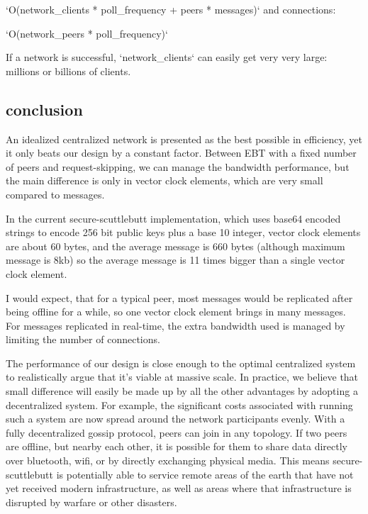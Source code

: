 \documentclass[sigconf]{acmart}
\begin{document}
`O(network\_clients * poll\_frequency + peers * messages)`
and connections:

`O(network\_peers * poll\_frequency)`

If a network is successful, `network\_clients` can easily get very very
large: millions or billions of clients.

\subsection{conclusion}

An idealized centralized network is presented as the best possible in
efficiency, yet it only beats our design by a constant factor. Between
EBT with a fixed number of peers and request-skipping, we can manage
the bandwidth performance, but the main difference is only in vector
clock elements, which are very small compared to messages.

In the current secure-scuttlebutt implementation, which uses base64
encoded strings to encode 256 bit public keys plus a base 10 integer,
vector clock elements are about 60 bytes, and the average message is
660 bytes (although maximum message is 8kb) so the average message is
11 times bigger than a single vector clock element.

I would expect, that for a typical peer, most messages would be
replicated after being offline for a while, so one vector clock
element brings in many messages. For messages replicated in real-time,
the extra bandwidth used is managed by limiting the number of
connections.

The performance of our design is close enough to the optimal
centralized system to realistically argue that it's viable at massive
scale. In practice, we believe that small difference will easily be
made up by all the other advantages by adopting a decentralized
system.  For example, the significant costs associated with running
such a system are now spread around the network participants
evenly. With a fully decentralized gossip protocol, peers can join in
any topology. If two peers are offline, but nearby each other, it is
possible for them to share data directly over bluetooth, wifi, or by
directly exchanging physical media. This means secure-scuttlebutt is
potentially able to service remote areas of the earth that have not
yet received modern infrastructure, as well as areas where that
infrastructure is disrupted by warfare or other disasters.

\end{document}
